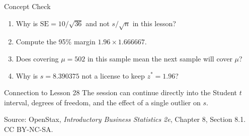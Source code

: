 \documentclass[aspectratio=169,10pt,english]{beamer}
\begin{document}
\begin{frame}{Concept Check}
  \begin{enumerate}
    \item Why is $\mathrm{SE}=10/\sqrt{36}$ and not $s/\sqrt{n}$ in this lesson?
    \item Compute the 95\% margin $1.96\times 1.666667$.
    \item Does covering $\mu=502$ in this sample mean the next sample will
      cover $\mu$?
    \item Why is $s=8.390375$ not a license to keep $z^{*}=1.96$?
  \end{enumerate}

  \vspace{0.6em}
  \begin{block}{Connection to Lesson 28}
    The session can continue directly into the Student $t$ interval, degrees
    of freedom, and the effect of a single outlier on $s$.
  \end{block}

  \vfill
  \scriptsize Source: OpenStax, \textit{Introductory Business Statistics 2e},
  Chapter 8, Section 8.1. CC BY-NC-SA.
\end{frame}

\appendix
\end{document}
